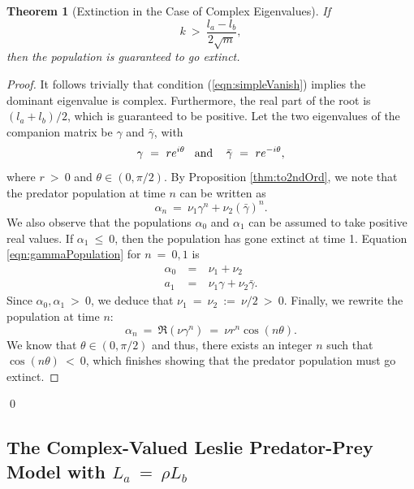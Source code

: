 \documentclass[11pt,reqno]{amsart}
\numberwithin{equation}{section}
\theoremstyle{plain}
\newtheorem{theorem}[thm]{Theorem}
\begin{document}
\begin{theorem}[Extinction in the Case of Complex Eigenvalues]
If 
\begin{equation}\label{eqn:simpleVanish}
    k \ > \  \frac {l_a - l_b} {2\sqrt{m}},
\end{equation}
then the population %
is guaranteed to go extinct. 
\end{theorem}
\begin{proof}
    It follows trivially that condition (\ref{eqn:simpleVanish}) 
    implies the dominant eigenvalue is complex. Furthermore, the real part of the root is $(l_a + l_b)/2$, which is guaranteed to be positive. Let the two eigenvalues of the companion matrix be $\gamma$ and $\bar \gamma$, with 
    \begin{equation}
    \gamma \ = \ r e^{i \theta} \hspace{3mm} \textrm{and} \hspace{3mm} \ \bar \gamma \ = \ r e^{-i \theta},
    \end{equation}
    where $r \ > \  0$ and $\theta \in (0, \pi/2)$. By Proposition \ref{thm:to2ndOrd}, we note that the predator population at time $n$ can be written as 
    \begin{equation}\label{eqn:gammaPopulation}
    \alpha_n \ = \ \nu_1 \gamma^n + \nu_2 (\bar \gamma)^n.
    \end{equation}
    We also observe that the populations $\alpha_0$ and $\alpha_1$ can be assumed to take positive real values. If $\alpha_1 \ \leq \  0$, then the population has gone extinct at time 1. 
    Equation \ref{eqn:gammaPopulation} for $n \ = \  0, 1$ is 
    \begin{eqnarray}
    \alpha_0 & \ = \ & \nu_1 + \nu_2 \nonumber\\ 
    a_1 & \ = \ & \nu_1\gamma + \nu_2\bar \gamma.
    \end{eqnarray}
    Since $\alpha_0, \alpha_1 \ > \  0$, we deduce that $\nu_1 \ = \ \nu_2 \ := \ \nu/2 \ > \  0$. Finally, we rewrite the population at time $n$:
    \begin{equation}
    \alpha_n \ = \ \Re (\nu \gamma ^n) \ = \  \nu r^n \cos(n\theta).
    \end{equation}
    We know that $\theta \in (0, \pi / 2)$ and thus, there exists an integer $n$ such that $\cos(n\theta) \ < \  0$, which finishes showing that the predator population must go extinct. 
\end{proof}
\hfill \qed

\subsection{The Complex-Valued Leslie Predator-Prey Model with $L_a \ = \ \rho L_b$}
\end{document}
